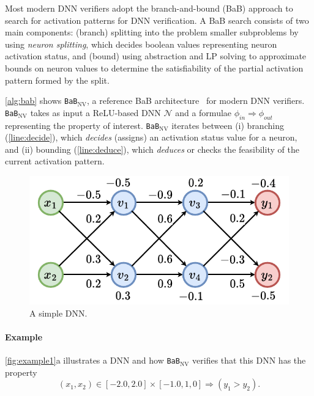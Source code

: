 \documentclass[oneside,11pt,dvipsnames]{book}
\numberwithin{equation}{section}
\theoremstyle{definition}
\theoremstyle{remark}
\newcommand{\prooflang}{\texttt{BaB$_{\text{ProofLang}}$}}
\newcommand{\bab}{\texttt{BaB$_{\text{NV}}$}}
\newcommand{\neuralsat}{\texttt{NeuralSAT}}
\begin{document}
Most modern DNN verifiers adopt the branch-and-bound (BaB) approach to search for activation patterns for DNN verification. A BaB search consists of two main components: (branch) splitting into the problem smaller subproblems 
by using \emph{neuron splitting}, which decides boolean values representing neuron activation status, 
and (bound) using abstraction and LP solving to approximate bounds on neuron values to determine 
the satisfiability of the partial activation pattern formed by the split.


\autoref{alg:bab} shows \bab{}, a reference BaB architecture~\cite{nakagawa2014consolidating} for modern DNN verifiers. \bab{} takes as input a ReLU-based DNN $\mathcal{N}$ and a formulae $\phi_{in}\Rightarrow \phi_{out}$ representing the property of interest.
\bab{} iterates between (i) branching (\autoref{line:decide}), which \emph{decides} (assigns) an activation status value for a neuron, and (ii) bounding (\autoref{line:deduce}), which \emph{deduces} or checks the feasibility of the current activation pattern. 




\begin{figure}[t]
    \centering
    \includegraphics[width=0.5\linewidth]{figure/proof_net.pdf}
    \caption{A simple DNN.}\label{fig:example1}
\end{figure}

\paragraph{Example} \autoref{fig:example1}a illustrates a DNN and how \bab{} verifies that this DNN has the property 
\[
(x_1, x_2) \in [-2.0, 2.0] \times [-1.0, 1,0] \Rightarrow (y_1 > y_2).
\] 
\end{document}
